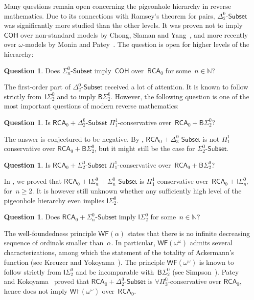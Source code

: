 \documentclass{article}
\def\NN{\mathbb{N}}
\newcommand{\ISig}{\mathsf{I}\Sigma^0}
\newcommand{\BSig}{\mathsf{B}\Sigma^0}
\newcommand{\WF}{\mathsf{WF}}
\newcommand{\Sub}[1]{{#1}\mbox{-}\mathsf{Subset}}
\newcommand{\RCA}{\mathsf{RCA}}
\newcommand{\COH}{\mathsf{COH}}
\numberwithin{theorem}{section}
\theoremstyle{definition}
\newtheorem{question}[theorem]{Question}
\begin{document}
Many questions remain open concerning the pigeonhole hierarchy in reverse mathematics. Due to its connections with Ramsey's theorem for pairs, $\Sub{\Delta^0_2}$ was significantly more studied than the other levels. It was proven not to imply $\COH$ over non-standard models by Chong, Slaman and Yang~\cite{chong2014metamathematics}, and more recently over $\omega$-models by Monin and Patey~\cite{monin2021srt}. The question is open for higher levels of the hierarchy:

\begin{question}
Does $\Sub{\Sigma^0_n}$ imply~$\COH$ over~$\RCA_0$ for some~$n \in \NN$?
\end{question}

The first-order part of $\Sub{\Delta^0_2}$ received a lot of attention. It is known to follow strictly from~$\ISig_2$ and to imply $\BSig_2$. However, the following question is one of the most important questions of modern reverse mathematics:

\begin{question}
Is $\RCA_0 + \Sub{\Delta^0_2}$ $\Pi^1_1$-conservative over~$\RCA_0 + \BSig_2$?
\end{question}

The answer is conjectured to be negative. By , $\RCA_0 + \Sub{\Delta^0_{3}}$ is not $\Pi_1^1$ conservative over $\RCA_0 + \BSig_2$, but it might still be the case for $\Sub{\Sigma^0_2}$.

\begin{question}\label{quest:sigma2-conservative-bsig2}
Is $\RCA_0 + \Sub{\Sigma^0_2}$ $\Pi^1_1$-conservative over~$\RCA_0 + \BSig_2$?
\end{question}

In , we proved that $\RCA_0 + \ISig_n + \Sub{\Sigma^0_n}$ is $\Pi^1_1$-conservative over~$\RCA_0 + \ISig_n$, for~$n \geq 2$. It is however still unknown whether any sufficiently high level of the pigeonhole hierarchy even implies $\ISig_2$.

\begin{question}\label{quest:sigman-imply-isig2}
Does $\RCA_0 + \Sub{\Sigma^0_n}$ imply $\ISig_2$ for some~$n \in \NN$?
\end{question}

The well-foundedness principle $\WF(\alpha)$ states that there is no infinite decreasing sequence of ordinals smaller than~$\alpha$. In particular, $\WF(\omega^\omega)$ admits several characterizations, among which the statement of the totality of Ackermann's function (see Kreuzer and Yokoyama~\cite{kreuzer2016principles}). The principle $\WF(\omega^\omega)$ is known to follow strictly from $\ISig_2$ and be incomparable with~$\BSig_2$ (see Simpson~\cite{simpson2015comparing}).
Patey and Kokoyama~\cite{patey2018proof} proved that $\RCA_0 + \Sub{\Delta^0_2}$ is $\forall \Pi^0_3$-conservative over $\RCA_0$, hence does not imply $\WF(\omega^\omega)$ over~$\RCA_0$.
\end{document}
